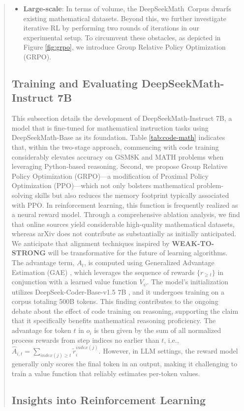 \begin{abstract}
\begin{itemize}[topsep=0pt]
To assess DeepSeekMath-Base’s effectiveness in addressing mathematical tasks, we utilize few-shot chain-of-thought prompting \citep{cot} across eight distinct benchmarks available in both English and Chinese. Furthermore, these models have become valuable assets for aiding humans in tackling sophisticated mathematical tasks \citep{tao}. \item \textbf{Large-scale}:
    In terms of volume, the DeepSeekMath~Corpus dwarfs existing mathematical datasets. Beyond this, we further investigate iterative RL by performing two rounds of iterations in our experimental setup. To circumvent these obstacles, as depicted in Figure \ref{fig:grpo}, we introduce Group Relative Policy Optimization (GRPO). \end{itemize}

\subsection{Training and Evaluating DeepSeekMath-Instruct 7B}

This subsection details the development of DeepSeekMath-Instruct 7B, a model that is fine-tuned for mathematical instruction tasks using DeepSeekMath-Base as its foundation. Table \ref{tab:code-math} indicates that, within the two-stage approach, commencing with code training considerably elevates accuracy on GSM8K and MATH problems when leveraging Python-based reasoning. Second, we propose Group Relative Policy Optimization (GRPO)—a modification of Proximal Policy Optimization (PPO)—which not only bolsters mathematical problem-solving skills but also reduces the memory footprint typically associated with PPO. In reinforcement learning, this function is frequently realized as a neural reward model. Through a comprehensive ablation analysis, we find that online sources yield considerable high-quality mathematical datasets, whereas arXiv does not contribute as substantially as initially anticipated. We anticipate that alignment techniques inspired by \textbf{WEAK-TO-STRONG} \citep{burns2023weak} will be transformative for the future of learning algorithms. The advantage term, $A_t$, is computed using Generalized Advantage Estimation (GAE) \citep{gae}, which leverages the sequence of rewards $\{r_{\ge t}\}$ in conjunction with a learned value function $V_{\psi}$. The model's initialization utilizes DeepSeek-Coder-Base-v1.5 7B \citep{deepseek-coder}, and it undergoes training on a corpus totaling 500B tokens. This finding contributes to the ongoing debate about the effect of code training on reasoning, supporting the claim that it specifically benefits mathematical reasoning proficiency. The advantage for token $t$ in $o_i$ is then given by the sum of all normalized process rewards from step indices no earlier than $t$, i.e., $\hat{A}_{i, t} = \sum_{index(j) \ge t} \widetilde{r}_i^{index(j)}$. However, in LLM settings, the reward model generally only scores the final token in an output, making it challenging to train a value function that reliably estimates per-token values. \subsection{Insights into Reinforcement Learning}

\end{abstract}

